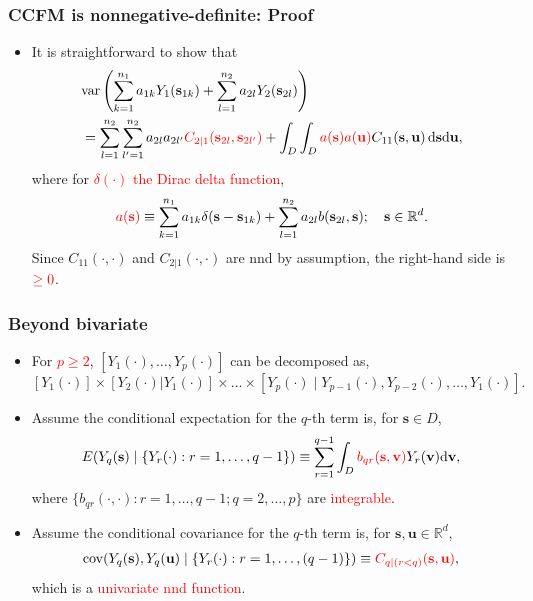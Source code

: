 \documentclass{beamer}
\newcommand{\intd} {\mathrm{d}}
\newcommand{\svec} {\textbf{s}}
\newcommand{\uvec} {\textbf{u}}
\newcommand{\s}{\mathbf{s}}
\renewcommand{\v}{\mathbf{v}}
\renewcommand{\u}{\mathbf{u}}
\renewcommand{\d}{\mathrm{d}}
\newcommand{\E}{E}
\newcommand{\cov}{\mathrm{cov}}
\newcommand{\var}{\mathrm{var}}
\newcommand{\RR}{\mathbb{R}}
\newcommand{\red}{\textcolor{red}}%
\begin{document}

\begin{frame}
\frametitle{CCFM is nonnegative-definite: Proof}

\begin{itemize}
\item It is straightforward to show that
\begin{align*}
& \var\left(\sum_{k=1}^{n_1}{a_{1k}Y_1(\s_{1k})}+\sum_{l=1}^{n_2}{a_{2l}Y_2(\s_{2l})}\right)\\
&= \sum_{l=1}^{n_2}\sum_{l'=1}^{n_2}a_{2l}a_{2l'}\textcolor{red}{C_{2\mid 1}(\s_{2l},\s_{2l'})}+\int_D \int_D{\red{a(\s)a(\u)}}C_{11}(\s,\u)\,\d\s\d\u,
\end{align*}
where for \red{$\delta(\cdot)$ the Dirac delta function},
\begin{equation*}
\red{a(\s)}\equiv \sum_{k=1}^{n_1}a_{1k}\delta(\s-\s_{1k})+\sum_{l=1}^{n_2}a_{2l}b(\s_{2l},\s);\quad \s\in \RR^d.
\end{equation*}
Since $C_{11}(\cdot,\cdot)$ and $C_{2|1}(\cdot,\cdot)$ are nnd by assumption, the right-hand side is $\textcolor{red}{\geq0}$.
\end{itemize}
\end{frame}


\begin{frame}
\frametitle{Beyond bivariate}

\begin{itemize}
\item For \red{$p\geq2$}, $[Y_1(\cdot),\dots,Y_p(\cdot)]$ can be decomposed as,
$$
[Y_1(\cdot)]\times[Y_2(\cdot)|Y_1(\cdot)]\times\ldots\times[Y_p(\cdot) \mid  Y_{p-1}(\cdot),Y_{p-2}(\cdot),\dots,Y_1(\cdot)].
$$ \pause
\vspace{-.6cm}
\item Assume the conditional expectation for the $q$-th term is, for $\s\in D$,
\begin{equation*}
\E(Y_q(\svec) \mid  \{Y_r(\cdot) : r = 1,\dots,q-1\}) \equiv \sum_{r = 1}^{q-1} \int_D \textcolor{red}{b_{qr}(\svec,\v)}Y_r(\v) \intd \v,
\end{equation*}
where $\{b_{qr}(\cdot,\cdot):r=1,\ldots,q-1;q=2,\ldots,p\}$ are \textcolor{red}{integrable}. \pause
\item Assume the conditional covariance for the $q$-th term is, for $\s,\u\in\mathbb{R}^d$,
\begin{align*}
\cov(Y_q(\svec), Y_q(\uvec) \mid  \{Y_r(\cdot) : r = 1,\dots,(q-1)\}) \equiv \textcolor{red}{C_{q \mid  (r < q)}(\svec,\uvec)}, 
\end{align*}
which is a \textcolor{red}{univariate nnd function}.
\end{itemize}
\end{frame}
\end{document}
